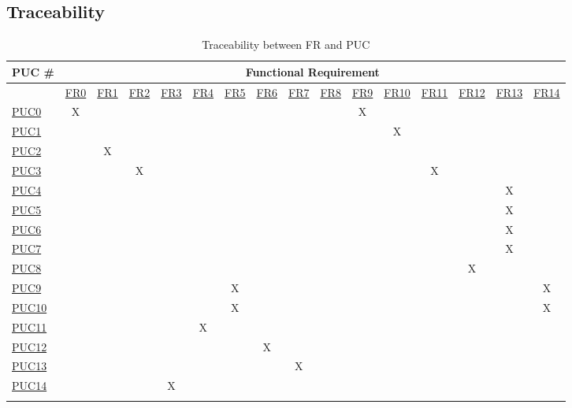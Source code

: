 \documentclass[12pt]{article}
\begin{document}
\subsection{Traceability}
\setlength\LTleft{-2cm}
\scriptsize
\begin{longtable}{l|ccccccccccccccc}

PUC \# & \multicolumn{15}{c}{Functional Requirement} \\ \hline
\endfirsthead
%
\endhead
%
 & \hyperref[sec:FR0]{FR0} & \hyperref[sec:FR1]{FR1} & \hyperref[sec:FR2]{FR2} & \hyperref[sec:FR3]{FR3} & \hyperref[sec:FR4]{FR4} & \hyperref[sec:FR5]{FR5} & \hyperref[sec:FR6]{FR6} & \hyperref[sec:FR7]{FR7} & \hyperref[sec:FR8]{FR8} & \hyperref[sec:FR9]{FR9} & \hyperref[sec:FR10]{FR10} & \hyperref[sec:FR11]{FR11} & \hyperref[sec:FR12]{FR12} & \hyperref[sec:FR13]{FR13} & \hyperref[sec:FR14]{FR14} \\
\hyperref[sec:PUC0]{PUC0} & X &  &  &  &  &  &  &  &  & X &  &  &  &  &  \\
\hyperref[sec:PUC1]{PUC1} &  &  &  &  &  &  &  &  &  &  & X &  &  &  &  \\
\hyperref[sec:PUC2]{PUC2} &  & X &  &  &  &  &  &  &  &  &  &  &  &  &  \\
\hyperref[sec:PUC3]{PUC3} &  &  & X &  &  &  &  &  &  &  &  & X &  &  &  \\
\hyperref[sec:PUC4]{PUC4} &  &  &  &  &  &  &  &  &  &  &  &  &  & X &  \\
\hyperref[sec:PUC5]{PUC5} &  &  &  &  &  &  &  &  &  &  &  &  &  & X &  \\
\hyperref[sec:PUC6]{PUC6} &  &  &  &  &  &  &  &  &  &  &  &  &  & X &  \\
\hyperref[sec:PUC7]{PUC7} &  &  &  &  &  &  &  &  &  &  &  &  &  & X &  \\
\hyperref[sec:PUC8]{PUC8} &  &  &  &  &  &  &  &  &  &  &  &  & X &  &  \\
\hyperref[sec:PUC9]{PUC9} &  &  &  &  &  & X &  &  &  &  &  &  &  &  & X \\
\hyperref[sec:PUC10]{PUC10} &  &  &  &  &  & X &  &  &  &  &  &  &  &  & X \\
\hyperref[sec:PUC11]{PUC11} &  &  &  &  & X &  &  &  &  &  &  &  &  &  &  \\
\hyperref[sec:PUC12]{PUC12} &  &  &  &  &  &  & X &  &  &  &  &  &  &  &  \\
\hyperref[sec:PUC13]{PUC13} &  &  &  &  &  &  &  & X &  &  &  &  &  &  &  \\
\hyperref[sec:PUC14]{PUC14} &  &  &  & X &  &  &  &  &  &  &  &  &  &  & \\
\caption{Traceability between FR and PUC} \\
\end{longtable}
\end{document}
